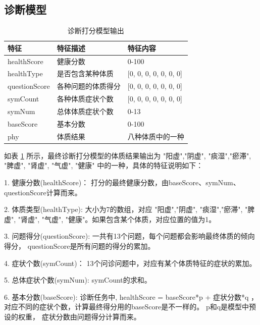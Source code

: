 \subsection{诊断模型}

\begin{table}[]
    \begin{center}
        \begin{tabular}{lll}
            \toprule
            特征 & 特征描述 & 特征内容 \\ 
            \midrule
            healthScore & 健康分数 & 0-100 \\
            healthType & 是否包含某种体质 & {[}0, 0, 0, 0, 0, 0, 0{]} \\ 
            questionScore & 各种问题的体质得分 & {[}0, 0, 0, 0, 0, 0, 0{]} \\
            symCount & 各种体质症状个数 & {[}0, 0, 0, 0, 0, 0, 0{]} \\
            symNum & 总体体质症状个数 & 0-13 \\
            baseScore & 基本分数 & 0-100 \\
            phy & 体质结果 & 八种体质中的一种\\
            \bottomrule
        \end{tabular}
    \end{center}
    \caption{诊断打分模型输出}
    \label{tab:diag-feature}
\end{table}


如表 \ref{tab:diag-feature} 所示，最终诊断打分模型的体质结果输出为 "阳虚","阴虚", "痰湿","瘀滞", "脾虚", "肾虚", "气虚", "健康" 中的一种，具体的特征说明如下：

1. 健康分数(healthScore)： 打分的最终健康分数，由baseScore、symNum、questionScore计算而来。

2. 体质类型(healthType): 大小为7的数组，对应 "阳虚","阴虚", "痰湿","瘀滞", "脾虚", "肾虚", "气虚", "健康"。如果包含某个体质，对应位置的值为1。

3. 问题得分(questionScore): 一共有13个问题，每个问题都会影响最终体质的倾向得分， questionScore是所有问题的得分的累加。

4. 症状个数(symCount)： 13个问诊问题中，对应有某个体质特征的症状的累加。

5. 总体症状个数(symNum): symCount的求和。

6. 基本分数(baseScore): 诊断任务中, healthScore = baseScore*p + 症状分数*q ，对应不同的症状个数，计算最终得分用的baseScore是不一样的。 
p和q是模型中预设的权重， 症状分数由问题得分计算而来。

